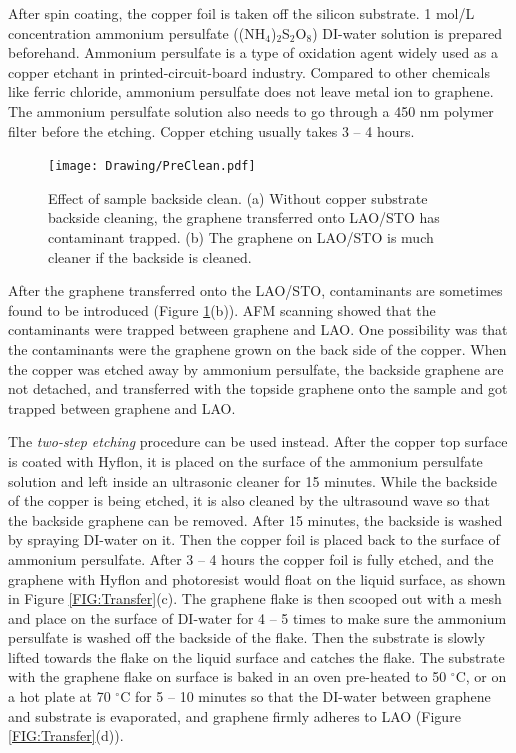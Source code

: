 \documentclass[pdflatex, sectionletters, 12pt, final, phd]{pittetd}    %
\begin{document}
After spin coating, the copper foil is taken off the silicon substrate. 1 mol/L concentration ammonium persulfate ((NH$_4$)$_2$S$_2$O$_8$) DI-water solution is prepared beforehand. Ammonium persulfate is a type of oxidation agent widely used as a copper etchant in printed-circuit-board industry. Compared to other chemicals like ferric chloride, ammonium persulfate does not leave metal ion to graphene. The ammonium persulfate solution also needs to go through a 450 nm polymer filter before the etching. Copper etching usually takes 3 -- 4 hours. 

\begin{figure}[h!]
	\centering
	\texttt{[image: Drawing/PreClean.pdf]}
	\caption[Effect of sample backside clean]{Effect of sample backside clean. (a) Without copper substrate backside cleaning, the graphene transferred onto LAO/STO has contaminant trapped. (b) The graphene on LAO/STO is much cleaner if the backside is cleaned.}
	\label{FIG:PreClean}
\end{figure}

After the graphene transferred onto the LAO/STO, contaminants are sometimes found to be introduced (Figure \ref{FIG:PreClean}(b)). AFM scanning showed that the contaminants were trapped between graphene and LAO. One possibility was that the contaminants were the graphene grown on the back side of the copper. When the copper was etched away by ammonium persulfate, the backside graphene are not detached, and transferred with the topside graphene onto the sample and got trapped between graphene and LAO. 

The \emph{two-step etching} procedure can be used instead. After the copper top surface is coated with Hyflon, it is placed on the surface of the ammonium persulfate solution and left inside an ultrasonic cleaner for 15 minutes. While the backside of the copper is being etched, it is also cleaned by the ultrasound wave so that the backside graphene can be removed. After 15 minutes, the backside is washed by spraying DI-water on it. Then the copper foil is placed back to the surface of ammonium persulfate. After 3 -- 4 hours the copper foil is fully etched, and the graphene with Hyflon and photoresist would float on the liquid surface, as shown in Figure \ref{FIG:Transfer}(c). The graphene flake is then scooped out with a mesh and place on the surface of DI-water for 4 -- 5 times to make sure the ammonium persulfate is washed off the backside of the flake. Then the substrate is slowly lifted towards the flake on the liquid surface and catches the flake. The substrate with the graphene flake on surface is baked in an oven pre-heated to 50 $^{\circ}$C, or on a hot plate at 70 $^{\circ}$C for 5 -- 10 minutes so that the DI-water between graphene and substrate is evaporated, and graphene firmly adheres to LAO (Figure \ref{FIG:Transfer}(d)).
\end{document}

